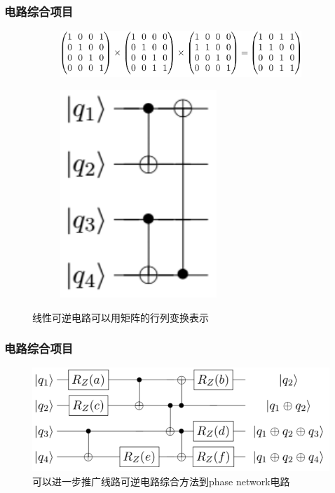 \documentclass[aspectratio=1610]{beamer}
\begin{document}
\begin{frame}
    \frametitle{电路综合项目}
    \begin{figure}[ht]
        \centering
        \begin{subfigure}{0.45\textwidth}
            \includegraphics[width=1.2\linewidth]{cnot.png}
        \end{subfigure}
        \hfill
        \begin{subfigure}{0.45\textwidth}
            \includegraphics[width=.5\linewidth]{cnot_circuit.png}
        \end{subfigure}
        \caption{线性可逆电路可以用矩阵的行列变换表示}
        \label{fig:figures}
    \end{figure}
\end{frame}
\begin{frame}
    \frametitle{电路综合项目}
    \begin{figure}[htbp]
        \includegraphics[width=.8\textwidth]{phase.png}
        \caption{可以进一步推广线路可逆电路综合方法到phase network电路}
    \end{figure}
\end{frame}
\end{document}
